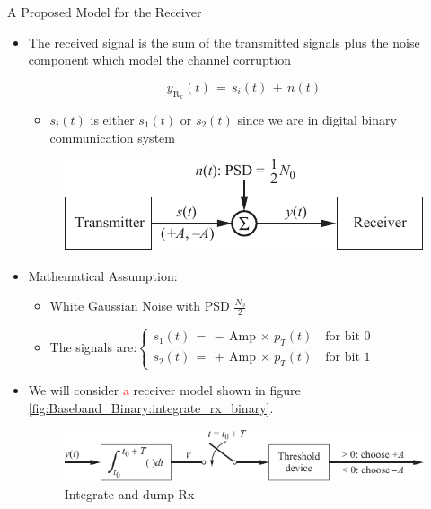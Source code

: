 \documentclass{Beamer}
\begin{document}
\begin{frame}[t,allowframebreaks]{A Proposed Model for the Receiver}

\begin{itemize}

\item The received signal is the sum of the transmitted signals plus the noise component which model the channel corruption

\begin{equation}
y_{\text{R}_x}(t) \, = \, s_i(t) \, + \, n(t)
\end{equation}

	\begin{itemize}
	\item $s_i(t)$ is either $s_1(t)$ or $s_2(t)$ since we are in digital binary communication system
	\end{itemize}


\begin{figure}[h]
\centering
\includegraphics[scale=0.8]{Figures/Baseband_Binary/block_rx_signa_and_noise}
\label{fig:Baseband_Binary:block_rx_signa_and_noise}
\end{figure}


\item Mathematical Assumption:

	\begin{itemize}
	\item White Gaussian Noise with PSD $\displaystyle\frac{N_0}{2}$
	
	\item The signals are:$ \begin{cases}
	s_1(t) \, = \, - \, \text{Amp} \, \times \,  p_T(t) \quad \text{for bit 0} \\
	s_2(t) \, = \, + \, \text{Amp} \,  \times \,  p_T(t) \quad \text{for bit 1}
	\end{cases}$
	

	\end{itemize}


\item We will consider \textcolor{red}{a} receiver model shown in figure \autoref{fig:Baseband_Binary:integrate_rx_binary}.

\begin{figure}[h]
\centering
\includegraphics[scale=0.8]{Figures/Baseband_Binary/integrate_rx_binary}
\caption{Integrate-and-dump Rx}
\label{fig:Baseband_Binary:integrate_rx_binary}
\end{figure}
		

\end{itemize}
\end{frame}
\end{document}
